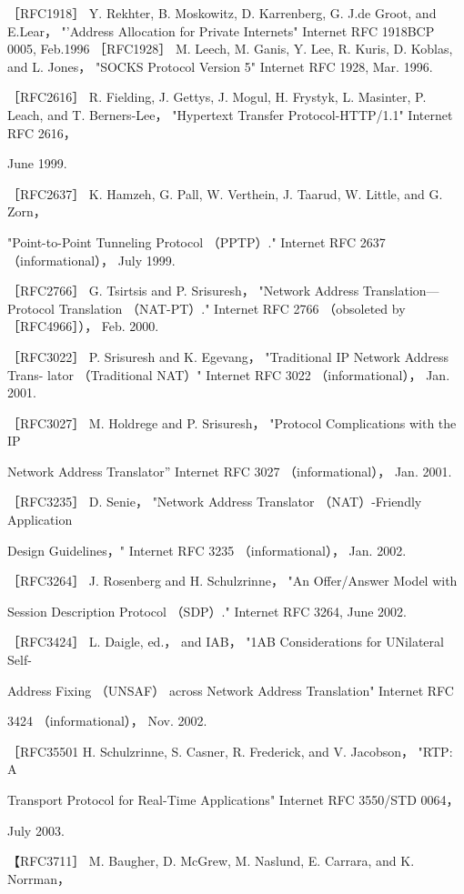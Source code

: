 ［RFC1918］ Y. Rekhter, B. Moskowitz, D. Karrenberg, G. J.de Groot, and E.Lear，
"'Address Allocation for Private Internets" Internet RFC 1918BCP 0005, Feb.1996
［RFC1928］ M. Leech, M. Ganis, Y. Lee, R. Kuris, D. Koblas, and L. Jones， "SOCKS
Protocol Version 5" Internet RFC 1928, Mar. 1996.

［RFC2616］ R. Fielding, J. Gettys, J. Mogul, H. Frystyk, L. Masinter, P. Leach, and
T. Berners-Lee， "Hypertext Transfer Protocol-HTTP/1.1" Internet RFC 2616，

June 1999.

［RFC2637］ K. Hamzeh, G. Pall, W. Verthein, J. Taarud, W. Little, and G. Zorn，

"Point-to-Point Tunneling Protocol （PPTP）." Internet RFC 2637 （informational），
July 1999.

［RFC2766］ G. Tsirtsis and P. Srisuresh， "Network Address Translation—Protocol
Translation （NAT-PT）." Internet RFC 2766 （obsoleted by ［RFC4966］）， Feb. 2000.

［RFC3022］ P. Srisuresh and K. Egevang， "Traditional IP Network Address Trans-
lator （Traditional NAT）" Internet RFC 3022 （informational）， Jan. 2001.

［RFC3027］ M. Holdrege and P. Srisuresh， "Protocol Complications with the IP

Network Address Translator” Internet RFC 3027 （informational）， Jan. 2001.

［RFC3235］ D. Senie， "Network Address Translator （NAT）-Friendly Application

Design Guidelines，" Internet RFC 3235 （informational）， Jan. 2002.

［RFC3264］ J. Rosenberg and H. Schulzrinne， "An Offer/Answer Model with

Session Description Protocol （SDP）." Internet RFC 3264, June 2002.

［RFC3424］ L. Daigle, ed.， and IAB， "1AB Considerations for UNilateral Self-

Address Fixing （UNSAF） across Network Address Translation" Internet RFC

3424 （informational）， Nov. 2002.

［RFC35501 H. Schulzrinne, S. Casner, R. Frederick, and V. Jacobson， "RTP: A

Transport Protocol for Real-Time Applications" Internet RFC 3550/STD 0064，

July 2003.

【RFC3711］ M. Baugher, D. McGrew, M. Naslund, E. Carrara, and K. Norrman，

